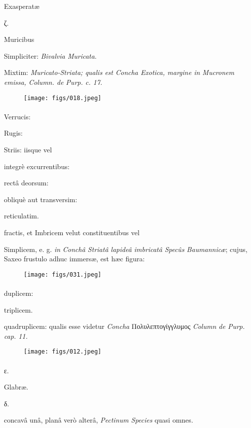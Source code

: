 \documentclass[a4paper, 11pt, oneside, polutonikogreek, german]{article}
\begin{document}
Exasperatæ

ζ.

Muricibus

Simpliciter: \emph{Bivalvia Muricata}.

Mixtim: \emph{Muricato-Striata; qualis est Concha Exotica, margine in Mucronem emissa, Column. de Purp. c. 17.}

\begin{figure}[H]
\centering
\texttt{[image: figs/018.jpeg]}
\end{figure}
\paragraph{}
Verrucis:

Rugis:

Striis: iisque vel

integrè excurrentibus:

rectâ deorsum:

obliquè aut transversim:

reticulatim.

fractis, et Imbricem velut constituentibus vel

Simplicem, e. g. \emph{in Conchâ Striatâ lapideâ imbricatâ Specûs Baumannicæ}; cujus, Saxeo frustulo adhuc immersæ, est hæc figura:

\begin{figure}[H]
\centering
\texttt{[image: figs/031.jpeg]}
\end{figure}
\paragraph{}
duplicem:

triplicem.

quadruplicem: qualis esse videtur \emph{Concha} Πολυλεπτογίγγλυμος \emph{Column de Purp. cap. 11.}

\begin{figure}[H]
\centering
\texttt{[image: figs/012.jpeg]}
\end{figure}
\paragraph{}
ε.

Glabræ.

δ.

concavâ unâ, planâ verò alterâ, \emph{Pectinum Species} quasi omnes.
\end{document}
